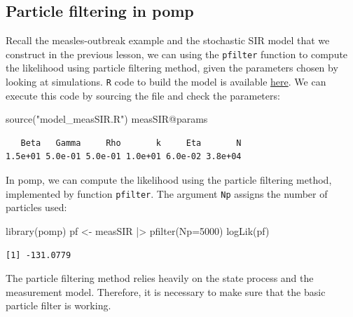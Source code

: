 \documentclass[
  letterpaper,
  DIV=11,
  numbers=noendperiod]{scrartcl}
\newenvironment{Shaded}{\begin{snugshade}}{\end{snugshade}}
\newcommand{\AttributeTok}[1]{\textcolor[rgb]{0.40,0.45,0.13}{#1}}
\newcommand{\DecValTok}[1]{\textcolor[rgb]{0.68,0.00,0.00}{#1}}
\newcommand{\FunctionTok}[1]{\textcolor[rgb]{0.28,0.35,0.67}{#1}}
\newcommand{\NormalTok}[1]{\textcolor[rgb]{0.00,0.23,0.31}{#1}}
\newcommand{\OtherTok}[1]{\textcolor[rgb]{0.00,0.23,0.31}{#1}}
\newcommand{\SpecialCharTok}[1]{\textcolor[rgb]{0.37,0.37,0.37}{#1}}
\newcommand{\StringTok}[1]{\textcolor[rgb]{0.13,0.47,0.30}{#1}}
\begin{document}
\hypertarget{particle-filtering-in-pomp}{%
\subsection{Particle filtering in
pomp}\label{particle-filtering-in-pomp}}

Recall the measles-outbreak example and the stochastic SIR model that we
construct in the previous lesson, we can using the \texttt{pfilter}
function to compute the likelihood using particle filtering method,
given the parameters chosen by looking at simulations. \texttt{R} code
to build the model is available \href{model_measSIR.R}{here}. We can
execute this code by sourcing the file and check the parameters:

\begin{Shaded}
\begin{Highlighting}[]
\FunctionTok{source}\NormalTok{(}\StringTok{"model\_measSIR.R"}\NormalTok{)}
\NormalTok{measSIR}\SpecialCharTok{@}\NormalTok{params}
\end{Highlighting}
\end{Shaded}

\begin{verbatim}
   Beta   Gamma     Rho       k     Eta       N 
1.5e+01 5.0e-01 5.0e-01 1.0e+01 6.0e-02 3.8e+04 
\end{verbatim}

\framebreak

In pomp, we can compute the likelihood using the particle filtering
method, implemented by function \texttt{pfilter}. The argument
\texttt{Np} assigns the number of particles used:

\begin{Shaded}
\begin{Highlighting}[]
\FunctionTok{library}\NormalTok{(pomp)}
\NormalTok{pf }\OtherTok{\textless{}{-}}\NormalTok{ measSIR }\SpecialCharTok{|\textgreater{}} \FunctionTok{pfilter}\NormalTok{(}\AttributeTok{Np=}\DecValTok{5000}\NormalTok{)}
\FunctionTok{logLik}\NormalTok{(pf)}
\end{Highlighting}
\end{Shaded}

\begin{verbatim}
[1] -131.0779
\end{verbatim}

\framebreak

The particle filtering method relies heavily on the state process and
the measurement model. Therefore, it is necessary to make sure that the
basic particle filter is working.
\end{document}
